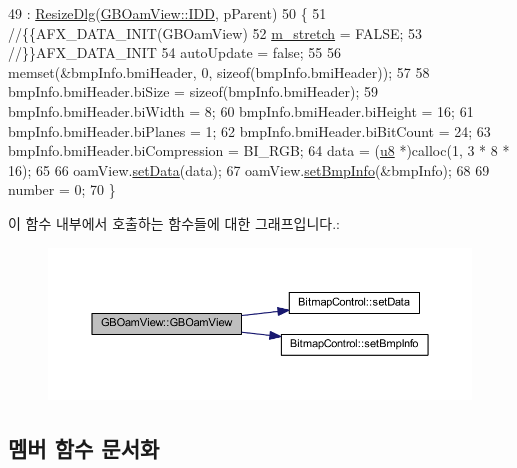 \begin{DoxyCode}
49   : \mbox{\hyperlink{class_resize_dlg_a87bab778e9312f274ebe750d4c3a67ee}{ResizeDlg}}(\mbox{\hyperlink{class_g_b_oam_view_a5c41d4094ee7a3c5fc13c3e57414e350ae84ca5a6130d1f054bb8372fc76c89c9}{GBOamView::IDD}}, pParent)
50 \{
51   \textcolor{comment}{//\{\{AFX\_DATA\_INIT(GBOamView)}
52   \mbox{\hyperlink{class_g_b_oam_view_a3148ea0439a7fc0679298adbdb5d2a3e}{m\_stretch}} = FALSE;
53   \textcolor{comment}{//\}\}AFX\_DATA\_INIT}
54   autoUpdate = \textcolor{keyword}{false};
55   
56   memset(&bmpInfo.bmiHeader, 0, \textcolor{keyword}{sizeof}(bmpInfo.bmiHeader));
57   
58   bmpInfo.bmiHeader.biSize = \textcolor{keyword}{sizeof}(bmpInfo.bmiHeader);
59   bmpInfo.bmiHeader.biWidth = 8;
60   bmpInfo.bmiHeader.biHeight = 16;
61   bmpInfo.bmiHeader.biPlanes = 1;
62   bmpInfo.bmiHeader.biBitCount = 24;
63   bmpInfo.bmiHeader.biCompression = BI\_RGB;
64   data = (\mbox{\hyperlink{_system_8h_aed742c436da53c1080638ce6ef7d13de}{u8}} *)calloc(1, 3 * 8 * 16);
65 
66   oamView.\mbox{\hyperlink{class_bitmap_control_aa6206183896caf192a37709fa5d7b8d2}{setData}}(data);
67   oamView.\mbox{\hyperlink{class_bitmap_control_a301c52fc62de4368fccdcdc93cefad0b}{setBmpInfo}}(&bmpInfo);
68 
69   number = 0;
70 \}
\end{DoxyCode}
이 함수 내부에서 호출하는 함수들에 대한 그래프입니다.\+:
\nopagebreak
\begin{figure}[H]
\begin{center}
\leavevmode
\includegraphics[width=350pt]{class_g_b_oam_view_a3e2e1ed3de07569a08af410042e1ba8f_cgraph}
\end{center}
\end{figure}


\subsection{멤버 함수 문서화}
\mbox{\label{class_g_b_oam_view_ab5683ad7b53ee6ac8208155503164506}} 
